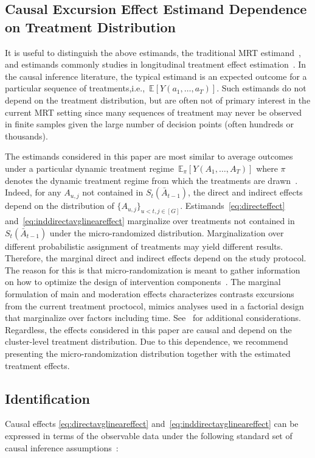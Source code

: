 \documentclass[12pt]{article}
\def\E{\mathbb{E}}
\begin{document}
\subsection{Causal Excursion Effect Estimand Dependence on Treatment Distribution}

It is useful to distinguish the above estimands, the traditional MRT estimand~\citep{Boruvkaetal}, and estimands commonly studies in longitudinal treatment effect estimation~\citep{Robins}. In the causal inference literature, the typical estimand is an expected outcome for a particular sequence of treatments,i.e.,~$\E \left[ Y(a_1,\ldots, a_T)\right]$.  Such estimands do not depend on the treatment distribution, but are often not of primary interest in the current MRT setting since many sequences of treatment may never be observed in finite samples given the large number of decision points (often hundreds or thousands).

The estimands considered in this paper are most similar to average outcomes under a particular dynamic treatment regime~$\E_\pi \left[ Y(A_1,\ldots, A_T)\right]$ where $\pi$ denotes the dynamic treatment regime from which the treatments are drawn~\citep{MurphyJASA2001}. Indeed, for any $A_{u,j}$ not contained in $S_t (\bar A_{t-1})$, the direct and indirect effects depend on the distribution of $\{ A_{u,j} \}_{u < t, j \in [G]}$.  Estimands~\eqref{eq:directeffect} and~\eqref{eq:inddirectavglineareffect} marginalize over treatments not contained in $S_t(\bar A_{t-1})$ under the micro-randomized distribution.  Marginalization over different probabilistic assignment of treatments may yield different results. Therefore, the marginal direct and indirect effects depend on the study protocol. The reason for this is that micro-randomization is meant to gather information on how to optimize the design of intervention components~\citep{Collins2018}.  The marginal formulation of main and moderation effects characterizes contrasts excursions from the current treatment proctocol, mimics analyses used in a factorial design that marginalize over factors including time. See~\citet[Section 8]{Qian2021} for additional considerations.  Regardless, the effects considered in this paper are causal and depend on the cluster-level treatment distribution.  Due to this dependence, we recommend presenting the micro-randomization distribution together with the estimated treatment effects.

\subsection{Identification}
\label{section:prox_effects_data}
Causal effects \eqref{eq:directavglineareffect} and~\eqref{eq:inddirectavglineareffect} can be expressed in terms of the observable data under the following standard set of causal inference assumptions~\cite{Robins}:
\end{document}
